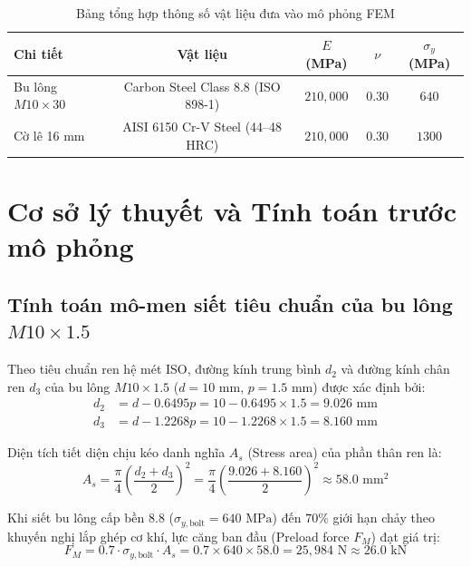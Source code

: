 \documentclass[12pt,a4paper]{article}
\begin{document}
\begin{table}[h!]
\centering
\caption{Bảng tổng hợp thông số vật liệu đưa vào mô phỏng FEM}
\vspace{4pt}
\begin{tabular}{@{}lcccc@{}}
\toprule
\textbf{Chi tiết} & \textbf{Vật liệu} & \textbf{$E$ (MPa)} & \textbf{$\nu$} & \textbf{$\sigma_y$ (MPa)} \\ \midrule
Bu lông $M10 \times 30$ & Carbon Steel Class 8.8 (ISO 898-1) & $210,000$ & $0.30$ & $640$ \\
Cờ lê 16 mm & AISI 6150 Cr-V Steel (44--48 HRC) & $210,000$ & $0.30$ & $1300$ \\ \bottomrule
\end{tabular}
\end{table}

\section{Cơ sở lý thuyết và Tính toán trước mô phỏng}

\subsection{Tính toán mô-men siết tiêu chuẩn của bu lông $M10 \times 1.5$}
Theo tiêu chuẩn ren hệ mét ISO, đường kính trung bình $d_2$ và đường kính chân ren $d_3$ của bu lông $M10 \times 1.5$ ($d = 10\text{ mm}$, $p = 1.5\text{ mm}$) được xác định bởi:
\begin{align}
    d_2 &= d - 0.6495p = 10 - 0.6495 \times 1.5 = 9.026\text{ mm} \\
    d_3 &= d - 1.2268p = 10 - 1.2268 \times 1.5 = 8.160\text{ mm}
\end{align}

Diện tích tiết diện chịu kéo danh nghĩa $A_s$ (Stress area) của phần thân ren là:
\begin{equation}
    A_s = \frac{\pi}{4} \left( \frac{d_2 + d_3}{2} \right)^2 = \frac{\pi}{4} \left( \frac{9.026 + 8.160}{2} \right)^2 \approx 58.0\text{ mm}^2
\end{equation}

Khi siết bu lông cấp bền 8.8 ($\sigma_{y,\text{bolt}} = 640\text{ MPa}$) đến $70\%$ giới hạn chảy theo khuyến nghị lắp ghép cơ khí, lực căng ban đầu (Preload force $F_M$) đạt giá trị:
\begin{equation}
    F_M = 0.7 \cdot \sigma_{y,\text{bolt}} \cdot A_s = 0.7 \times 640 \times 58.0 = 25,984\text{ N} \approx 26.0\text{ kN}
\end{equation}
\end{document}
